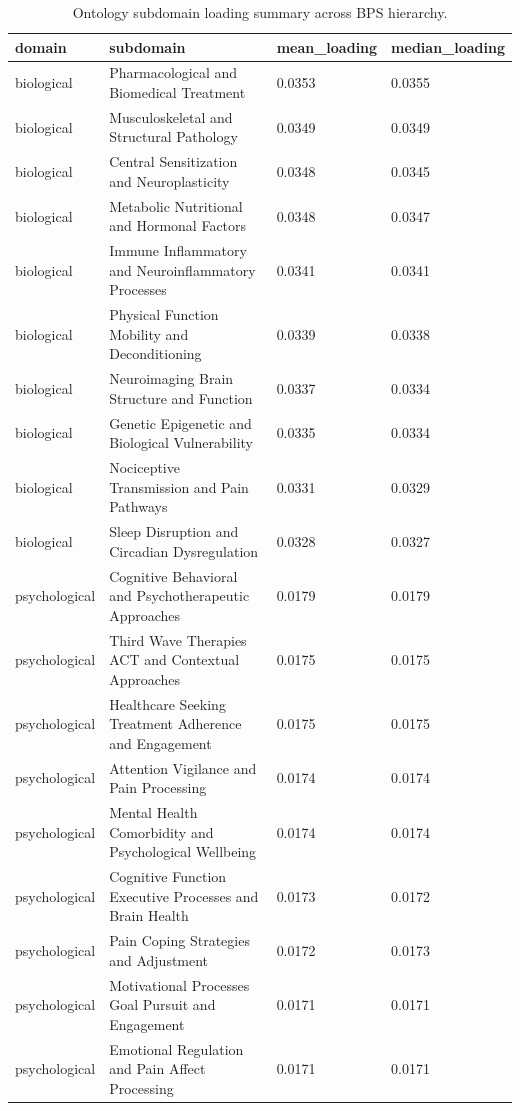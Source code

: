 \begin{table}[htbp]
\raggedright
\caption{Ontology subdomain loading summary across BPS hierarchy.}
\label{tab.semantic.subdomain.summary}
\begin{tabular}{llll}
\toprule
domain & subdomain & mean\_loading & median\_loading \\
\midrule
biological & Pharmacological and Biomedical Treatment & 0.0353 & 0.0355 \\
biological & Musculoskeletal and Structural Pathology & 0.0349 & 0.0349 \\
biological & Central Sensitization and Neuroplasticity & 0.0348 & 0.0345 \\
biological & Metabolic Nutritional and Hormonal Factors & 0.0348 & 0.0347 \\
biological & Immune Inflammatory and Neuroinflammatory Processes & 0.0341 & 0.0341 \\
biological & Physical Function Mobility and Deconditioning & 0.0339 & 0.0338 \\
biological & Neuroimaging Brain Structure and Function & 0.0337 & 0.0334 \\
biological & Genetic Epigenetic and Biological Vulnerability & 0.0335 & 0.0334 \\
biological & Nociceptive Transmission and Pain Pathways & 0.0331 & 0.0329 \\
biological & Sleep Disruption and Circadian Dysregulation & 0.0328 & 0.0327 \\
psychological & Cognitive Behavioral and Psychotherapeutic Approaches & 0.0179 & 0.0179 \\
psychological & Third Wave Therapies ACT and Contextual Approaches & 0.0175 & 0.0175 \\
psychological & Healthcare Seeking Treatment Adherence and Engagement & 0.0175 & 0.0175 \\
psychological & Attention Vigilance and Pain Processing & 0.0174 & 0.0174 \\
psychological & Mental Health Comorbidity and Psychological Wellbeing & 0.0174 & 0.0174 \\
psychological & Cognitive Function Executive Processes and Brain Health & 0.0173 & 0.0172 \\
psychological & Pain Coping Strategies and Adjustment & 0.0172 & 0.0173 \\
psychological & Motivational Processes Goal Pursuit and Engagement & 0.0171 & 0.0171 \\
psychological & Emotional Regulation and Pain Affect Processing & 0.0171 & 0.0171 \\

\end{tabular}
\end{table}

